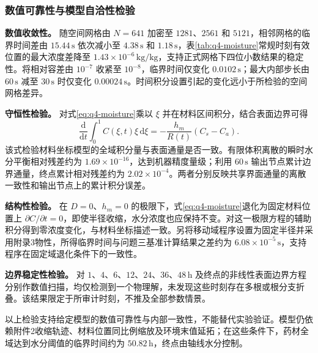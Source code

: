 \subsubsection{数值可靠性与模型自洽性检验}

\textbf{数值收敛性。} 随空间网格由 $N=641$ 加密至 $1281$、$2561$ 和 $5121$，相邻网格的临界时间差由 $15.44\,\mathrm{s}$ 依次减小至 $4.38\,\mathrm{s}$ 和 $1.18\,\mathrm{s}$，表\ref{tab:q4-moisture}常规时刻有效位置的最大浓度差降至 $1.43\times10^{-6}\,\mathrm{kg/kg}$，支持正式网格下四位小数结果的稳定性。将相对容差由 $10^{-7}$ 收紧至 $10^{-8}$，临界时间仅变化 $0.0102\,\mathrm{s}$；最大内部步长由 $60\,\mathrm{s}$ 减至 $30\,\mathrm{s}$ 时仅变化 $0.00024\,\mathrm{s}$。时间积分设置引起的变化远小于所检验的空间网格差异。

\textbf{守恒性检验。} 对式\eqref{eq:q4-moisture}乘以 $\xi$ 并在材料区间积分，结合表面边界可得
\begin{equation}
\frac{\mathrm{d}}{\mathrm{d}t}\int_0^1 C(\xi,t)\xi\,\mathrm{d}\xi
=-\frac{h_m}{R(t)}(C_s-C_a).
\label{eq:q4-balance}
\end{equation}
该式检验材料坐标模型的全域积分量与表面通量是否一致。有限体积离散的瞬时水分平衡相对残差约为 $1.69\times10^{-16}$，达到机器精度量级；利用 $60\,\mathrm{s}$ 输出节点累计边界通量，终点累计相对残差约为 $2.02\times10^{-4}$。两者分别反映共享界面通量的离散一致性和输出节点上的累计积分误差。

\textbf{结构性检验。} 在 $D=0$、$h_m=0$ 的极限下，式\eqref{eq:q4-moisture}退化为固定材料位置上 $\partial C/\partial t=0$，即使半径收缩，水分浓度也应保持不变。对这一极限方程的辅助积分得到零浓度变化，与材料坐标描述一致。另将移动域程序设置为固定半径并采用附录3物性，所得临界时间与问题三基准计算结果之差约为 $6.08\times10^{-5}\,\mathrm{s}$，支持程序在固定域退化条件下的一致性。

\textbf{边界稳定性检验。} 对 $1$、$4$、$6$、$12$、$24$、$36$、$48\,\mathrm{h}$ 及终点的非线性表面边界方程分别作数值扫描，均仅检测到一个物理解，未发现这些时刻存在多根或根分支折叠。该结果限定于所审计时刻，不推及全部参数情景。

以上检验支持给定模型的数值可靠性与内部一致性，不能替代实验验证。模型仍依赖附件2收缩轨迹、材料位置同比例缩放及环境末值延拓；在这些条件下，药材全域达到水分阈值的临界时间约为 $50.82\,\mathrm{h}$，终点由轴线水分控制。

